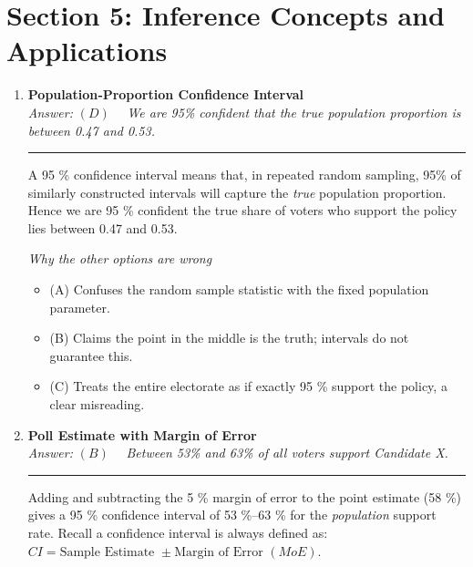 \documentclass[12pt]{article}
\begin{document}
\section*{Section 5: Inference Concepts and Applications}

\begin{enumerate}[label=5.\arabic*]
\item \textbf{Population‐Proportion Confidence Interval}\\[2pt]


\textit{Answer:}\; $\boxed{(D)} \quad$ \emph{We are 95\% confident that the true population proportion is between 0.47 and 0.53.} \newline \noindent\hspace*{0.01cm}\rule{\linewidth}{0.1pt}

A 95 \% confidence interval means that, in repeated random sampling, 95\% of similarly constructed intervals will capture the \emph{true} population proportion.  
Hence we are 95 \% confident the true share of voters who support the policy lies between 0.47 and 0.53.

\smallskip
\emph{Why the other options are wrong}
\begin{itemize}
  \item (A) Confuses the random sample statistic with the fixed population parameter.  
  \item (B) Claims the point in the middle is the truth; intervals do not guarantee this.  
  \item (C) Treats the entire electorate as if exactly 95 \% support the policy, a clear misreading.
\end{itemize}

\item \textbf{Poll Estimate with Margin of Error}\\[2pt]

\textit{Answer:}\; $\boxed{(B)} \quad$ \emph{Between 53\% and 63\% of all voters support Candidate X.}  \newline \noindent\hspace*{0.01cm}\rule{\linewidth}{0.1pt}

Adding and subtracting the 5 \% margin of error to the point estimate (58 \%) gives a 95 \% confidence interval of 53 \%–63 \% for the \emph{population} support rate. Recall a confidence interval is always defined as: $CI = \text{Sample Estimate } \pm \text{Margin of Error }(MoE)$.


\end{enumerate}
\end{document}
